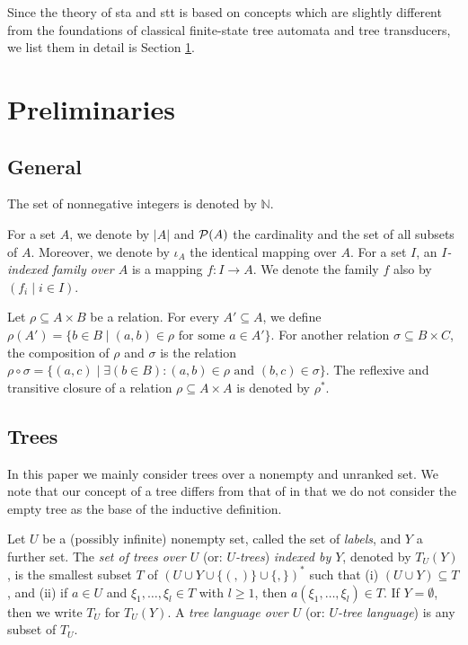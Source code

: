 \documentclass[10pt]{scrartcl}
\newcommand{\nat}{\mathbb{N}}
\begin{document}
Since the theory of sta and stt is based on concepts which are slightly different from the foundations of classical finite-state tree automata and tree transducers, we list them in detail is Section  \ref{prel-section}.



\section{Preliminaries}\label{prel-section}


\subsection{General}

The set of nonnegative integers is denoted by $\nat.$ 

For a set $A$, we denote by $|A|$ and ${\cal P}(A)$ the cardinality and
the set of all subsets of $A$. Moreover, we denote by $\iota_A$ the identical mapping over $A$. For a set $I$, an \emph{$I$-indexed family over $A$} is a
mapping $f:I \rightarrow A$. We denote the family $f$ also by $(f_i
\mid i \in I)$. 

Let $\rho \subseteq A \times B$ be a relation. For every $A'\subseteq A$, we define $\rho(A')= \{b\in B\mid  (a,b)\in \rho \text{ for some } a\in A'\}$.
For another relation $\sigma \subseteq B \times C$, the composition of $\rho$ and $\sigma$ is the relation
$\rho \circ \sigma =\{(a,c) \mid \exists(b\in B) : (a,b)\in \rho \text{ and } (b,c)\in \sigma \}$.
The reflexive and transitive closure of a relation $\rho \subseteq A \times A$ is denoted by $\rho^*$.

\subsection{Trees}\label{sect:trees}

In this paper we mainly consider trees over a nonempty and unranked set. We note that our concept of a tree differs from that of \cite{veabjo11a,veabjo11b} in that we do not consider the empty tree as the base of the inductive definition. 

Let $U$ be a (possibly infinite) nonempty set, called the set of {\em labels}, and $Y$ a further set. The {\em set of trees over $U$} (or: {\em $U$-trees}) {\em indexed by $Y$}, denoted by $T_U(Y)$, is the smallest subset $T$ of $(U\cup Y\cup\{(,)\}\cup\{,\})^*$ such that  (i) $(U\cup Y)\subseteq T$, and (ii) if $a \in U$ and $\xi_1,\ldots ,\xi_l \in T$ with $l \ge 1$, then $a(\xi_1, \ldots,\xi_l) \in T$.  If $Y=\emptyset$, then we write $T_U$ for $T_U(Y)$. A {\em tree language over $U$}  (or: {\em $U$-tree language}) is any subset of $T_U$.
\end{document}
